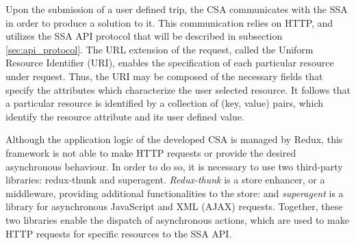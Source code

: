Upon the submission of a user defined trip, the CSA communicates with the SSA in order to produce a solution to it. This communication relies on HTTP, and utilizes the SSA API protocol that will be described in subsection \ref{sec:api_protocol}. The URL extension of the request, called the Uniform Resource Identifier (URI), enables the specification of each particular resource under request. Thus, the URI may be composed of the necessary fields that specify the attributes which characterize the user selected resource. It follows that a particular resource is identified by a collection of (key, value) pairs, which identify the resource attribute and its user defined value.

Although the application logic of the developed CSA is managed by Redux, this framework is not able to make HTTP requests or provide the desired asynchronous behaviour. In order to do so, it is necessary to use two third-party  libraries: redux-thunk and superagent. \textit{Redux-thunk} is a store enhancer, or a middleware, providing additional functionalities to the store: and \textit{superagent} is a library for asynchronous JavaScript and XML (AJAX) requests. Together, these two libraries enable the dispatch of asynchronous actions, which are used to make HTTP requests for specific resources to the SSA API.




